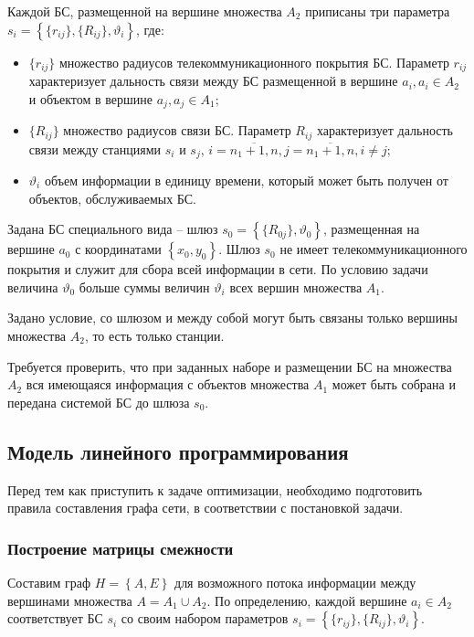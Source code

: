 Каждой БС, размещенной на вершине множества $A_2$ приписаны три параметра $s_i = \left\{ \{r_{ij}\}, \{R_{ij}\},\vartheta_i \right\} $, где:

\begin{itemize}
    \item $\{r_{ij}\}$ множество радиусов телекоммуникационного покрытия БС. Параметр $r_{ij}$ характеризует дальность связи между БС размещенной в вершине $a_i, a_i \in A_2$ и объектом в вершине $a_j, a_j \in A_1$;
    \item $\{R_{ij}\}$  множество радиусов связи БС. Параметр $R_{ij}$ характеризует дальность связи между станциями $s_i$ и $s_j$, $i= \overline{n_1+1,n}, j = \overline{n_1+1,n}, i \neq j$;
    \item $\vartheta_i$  объем информации в единицу времени, который может быть получен от объектов, обслуживаемых БС.
\end{itemize}

Задана БС специального вида -- шлюз  $s_0 = \left\{\{R_{0j}\}, \vartheta_0 \right\} $, размещенная на вершине $a_0$ с координатами $\left\{x_0, y_0 \right\}$. Шлюз $s_0$ не имеет телекоммуникационного покрытия и служит для сбора всей информации в сети. По условию задачи величина $\vartheta_0$ больше суммы величин $\vartheta_i$ всех вершин множества $A_1$.

Задано условие, со шлюзом и между собой могут быть связаны только вершины множества $A_2$, то есть только станции.

Требуется проверить, что при заданных наборе и размещении БС на множества $A_2$ вся имеющаяся информация с объектов множества $A_1$ может быть собрана и передана системой БС  до шлюза $s_0$.

\subsection{Модель линейного программирования}
Перед тем как приступить к задаче оптимизации, необходимо подготовить правила составления графа сети, в соответствии с постановкой задачи.

\subsubsection{Построение матрицы смежности}

Составим граф $ H = \left\{A,E \right\} $ для возможного потока информации между вершинами множества $ A = A_1 \cup A_2 $. По определению, каждой вершине $a_i \in A_2 $ соответствует БС $s_i$ со своим набором параметров $s_i = \left\{ \{r_{ij}\}, \{R_{ij}\},\vartheta_i \right\} $.

